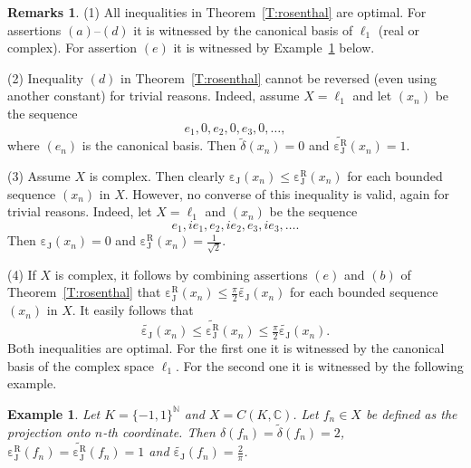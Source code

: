 \documentclass{amsart}
\numberwithin{equation}{section}
\newtheorem{example}[thm]{Example}
\theoremstyle{definition}
\newtheorem{remarks}[thm]{Remarks}
\def\ce{\mathbb C}
\def\en{\mathbb N}
\def\wde#1{\widetilde{\delta}\left(#1\right)}
\def\de#1{\delta\left(#1\right)}
\def\cj#1{\operatorname{\varepsilon_J}\left(#1\right)}
\def\dcj#1{\widetilde{\operatorname{\varepsilon_J}}\left(#1\right)}
\def\cjr#1{\operatorname{\varepsilon_J^R}\left(#1\right)}
\def\dcjr#1{\widetilde{\operatorname{\varepsilon_J^R}}\left(#1\right)}
\begin{document}
\begin{remarks}
(1) All inequalities in Theorem~\ref{T:rosenthal} are optimal. For assertions $(a)$--$(d)$ it is witnessed by the canonical basis of $\ell_1$ (real or complex). For assertion $(e)$ it is witnessed by Example~\ref{ex:cantor} below.

 (2) Inequality $(d)$ in Theorem~\ref{T:rosenthal} cannot be reversed (even using another constant) for trivial reasons. Indeed, assume $X=\ell_1$ and let $(x_n)$ be the sequence
 $$e_1,0,e_2,0,e_3,0,\dots,$$
 where $(e_n)$ is the canonical basis. Then $\wde{x_n}=0$ and $\dcjr{x_n}=1$.

 (3) Assume $X$ is complex. Then clearly $\cj{x_n}\le \cjr{x_n}$ for each bounded sequence $(x_n)$ in $X$. However, no converse of this inequality is valid, again for trivial reasons. Indeed, let $X=\ell_1$ and $(x_n)$ be the sequence
 $$e_1,ie_1,e_2,ie_2,e_3,ie_3,\dots.$$
 Then $\cj{x_n}=0$ and $\cjr{x_n}=\frac1{\sqrt{2}}$.

 (4) If $X$ is complex, it follows by combining assertions $(e)$ and $(b)$ of Theorem~\ref{T:rosenthal} that $\cjr{x_n}\le \frac\pi2\dcj{x_n}$  for each bounded sequence $(x_n)$ in $X$. It easily follows that
 $$\dcj{x_n}\le \dcjr{x_n}\le\tfrac\pi2\dcj{x_n}.$$
Both inequalities are optimal. For the first one it is witnessed by the canonical basis of the complex space $\ell_1$.  For the second one it is witnessed by the following example.
\end{remarks}

\begin{example}\label{ex:cantor}
    Let $K=\{-1,1\}^\en$ and $X=C(K,\ce)$. Let $f_n\in X$ be defined as the projection onto $n$-th coordinate. Then $\de{f_n}=\wde{f_n}=2$, $\cjr{f_n}=\dcjr{f_n}=1$ and $\dcj{f_n}=\frac2{\pi}$.
\end{example}
\end{document}
